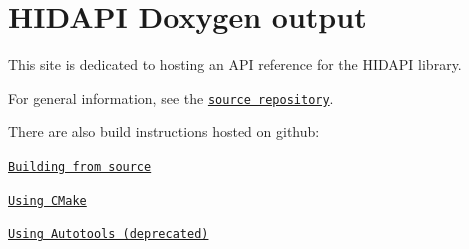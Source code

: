 \chapter{HIDAPI Doxygen output }
\hypertarget{md__mono_runtime_2extern_2sdl_2src_2hidapi_2doxygen_2main__page}{}\label{md__mono_runtime_2extern_2sdl_2src_2hidapi_2doxygen_2main__page}
\label{md__mono_runtime_2extern_2sdl_2src_2hidapi_2doxygen_2main__page_autotoc_md1658}%
%


This site is dedicated to hosting an API reference for the HIDAPI library.

For general information, see the \href{https://github.com/libusb/hidapi\#readme}{\texttt{source repository}}.

There are also build instructions hosted on github:\+


\begin{DoxyItemize}
\item \href{https://github.com/libusb/hidapi/blob/master/BUILD.md}{\texttt{Building from source}}
\item \href{https://github.com/libusb/hidapi/blob/master/BUILD.cmake.md}{\texttt{Using CMake}}
\item \href{https://github.com/libusb/hidapi/blob/master/BUILD.autotools.md}{\texttt{Using Autotools (deprecated)}} 
\end{DoxyItemize}